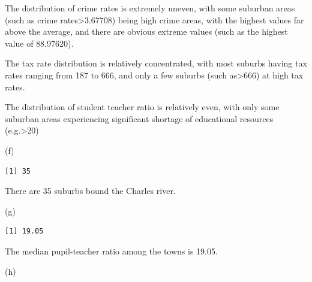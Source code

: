 \documentclass[
]{article}
\newenvironment{Shaded}{\begin{snugshade}}{\end{snugshade}}
\newcommand{\AttributeTok}[1]{\textcolor[rgb]{0.40,0.45,0.13}{#1}}
\newcommand{\ConstantTok}[1]{\textcolor[rgb]{0.56,0.35,0.01}{#1}}
\newcommand{\DecValTok}[1]{\textcolor[rgb]{0.68,0.00,0.00}{#1}}
\newcommand{\FunctionTok}[1]{\textcolor[rgb]{0.28,0.35,0.67}{#1}}
\newcommand{\NormalTok}[1]{\textcolor[rgb]{0.00,0.23,0.31}{#1}}
\newcommand{\OtherTok}[1]{\textcolor[rgb]{0.00,0.23,0.31}{#1}}
\newcommand{\SpecialCharTok}[1]{\textcolor[rgb]{0.37,0.37,0.37}{#1}}
\begin{document}
The distribution of crime rates is extremely uneven, with some suburban
areas (such as crime rates\textgreater3.67708) being high crime areas,
with the highest values far above the average, and there are obvious
extreme values (such as the highest value of 88.97620).

The tax rate distribution is relatively concentrated, with most suburbs
having tax rates ranging from 187 to 666, and only a few suburbs (such
as\textgreater666) at high tax rates.

The distribution of student teacher ratio is relatively even, with only
some suburban areas experiencing significant shortage of educational
resources (e.g.\textgreater20)

(f)

\begin{Shaded}
\end{Shaded}

\begin{verbatim}
[1] 35
\end{verbatim}

There are 35 suburbs bound the Charles river.

(g)

\begin{Shaded}
\end{Shaded}

\begin{verbatim}
[1] 19.05
\end{verbatim}

The median pupil-teacher ratio among the towns is 19.05.

(h)

\begin{Shaded}
\end{Shaded}
\end{document}
